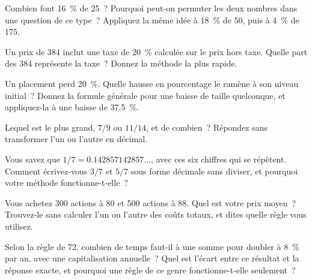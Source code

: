 \begin{question}\label{iq:iv1:mental-technique:6}
Combien font 16~\% de 25~? Pourquoi peut-on permuter les deux nombres dans une question de ce type~? Appliquez la même idée à 18~\% de 50, puis à 4~\% de 175.
\end{question}

\begin{question}\label{iq:iv1:mental-technique:7}
Un prix de 384 inclut une taxe de 20~\% calculée sur le prix hors taxe. Quelle part des 384 représente la taxe~? Donnez la méthode la plus rapide.
\end{question}

\begin{question}\label{iq:iv1:mental-technique:8}
Un placement perd 20~\%. Quelle hausse en pourcentage le ramène à son niveau initial~? Donnez la formule générale pour une baisse de taille quelconque, et appliquez-la à une baisse de 37.5~\%.
\end{question}

\begin{question}\label{iq:iv1:mental-technique:9}
Lequel est le plus grand, $7/9$ ou $11/14$, et de combien~? Répondez sans transformer l'un ou l'autre en décimal.
\end{question}

\begin{question}\label{iq:iv1:mental-technique:10}
Vous savez que $1/7 = 0.142857142857\dots$, avec ces six chiffres qui se répètent. Comment écrivez-vous $3/7$ et $5/7$ sous forme décimale sans diviser, et pourquoi votre méthode fonctionne-t-elle~?
\end{question}

\begin{question}\label{iq:iv1:mental-technique:11}
Vous achetez 300 actions à 80 et 500 actions à 88. Quel est votre prix moyen~? Trouvez-le sans calculer l'un ou l'autre des coûts totaux, et dites quelle règle vous utilisez.
\end{question}

\begin{question}\label{iq:iv1:mental-technique:12}
Selon la règle de 72, combien de temps faut-il à une somme pour doubler à 8~\% par an, avec une capitalisation annuelle~? Quel est l'écart entre ce résultat et la réponse exacte, et pourquoi une règle de ce genre fonctionne-t-elle seulement~?
\end{question}

